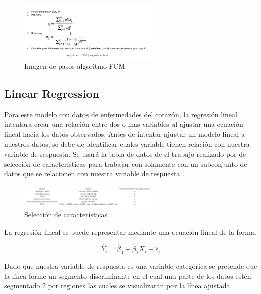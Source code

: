 \documentclass[10pt,journal]{IEEEtran}
\begin{document}
\begin{figure}
    \centering
    \includegraphics[width=0.60\textwidth]{fcm_algo.png}
    \caption{ Imagen de pasos algoritmo FCM \cite{yufeng_2021_fuzzy}} 
    \label{fig:fcm_algo}
\end{figure}

\subsection{Linear Regression}

Para este modelo con datos de enfermedades del corazón, la regresión lineal intentara crear una relación entre dos o mas variables al ajustar una ecuación lineal hacia los datos observados. 
Antes de intentar ajustar un modelo lineal a nuestros datos, se debe de identificar cuales variable tienen relación con nuestra variable de respuesta.
Se usará la tabla de datos de el trabajo realizado \cite{emmanuelramosFeatureSelection} por de selección de características para trabajar con solamente con un subconjunto de datos que se relacionen con nuestra variable de respuesta .

\begin{figure}[ht]
    \centering
    \includegraphics[width=0.60\textwidth]{feature_selection_cap4.png}
    \caption{Selección de características} 
    \label{fig:feature_selec}
\end{figure}


 La regresión lineal se puede representar mediante una ecuación lineal de la forma.

\begin{equation}
\hat{Y}_i = \hat{\beta}_0 + \hat{\beta}_1 X_i + \hat{\epsilon}_i
\end{equation}


Dado que nuestra variable de respuesta es una variable categórica se pretende que la línea forme un segmento discriminante en el cual una parte de los datos estén segmentado 2 por regiones las cuales se visualizaran por la línea ajustada.
\end{document}
